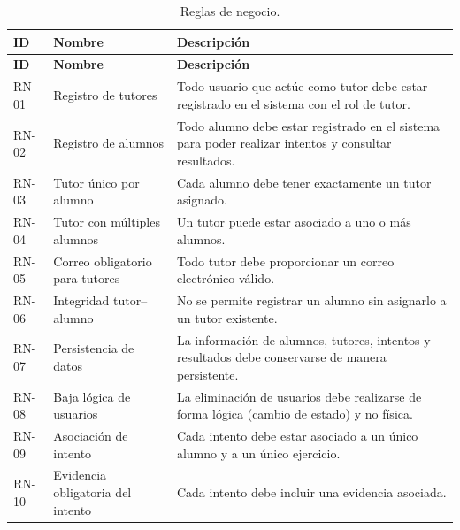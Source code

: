 \begin{longtable}{|>{\centering\arraybackslash}m{2cm}|m{3.6cm}|
  Y{\dimexpr\textwidth-5.6cm-6\arrayrulewidth\relax}|}
\caption{Reglas de negocio.}
\label{tab:rn} \\

\hline
\textbf{ID} & \textbf{Nombre} & \textbf{Descripción}  \\
\hline
\endfirsthead

\hline
\textbf{ID} & \textbf{Nombre} & \textbf{Descripción}  \\
\hline
\endhead

\hline
\endfoot
\endlastfoot

RN-01 & Registro de tutores &
Todo usuario que actúe como tutor debe estar registrado en el sistema con el rol de tutor. \\ \hline

RN-02 & Registro de alumnos &
Todo alumno debe estar registrado en el sistema para poder realizar intentos y consultar resultados. \\ \hline

RN-03 & Tutor único por alumno &
Cada alumno debe tener exactamente un tutor asignado. \\ \hline

RN-04 & Tutor con múltiples alumnos &
Un tutor puede estar asociado a uno o más alumnos. \\ \hline

RN-05 & Correo obligatorio para tutores &
Todo tutor debe proporcionar un correo electrónico válido. \\ \hline

RN-06 & Integridad tutor--alumno &
No se permite registrar un alumno sin asignarlo a un tutor existente. \\ \hline

RN-07 & Persistencia de datos &
La información de alumnos, tutores, intentos y resultados debe conservarse de manera persistente. \\ \hline

RN-08 & Baja lógica de usuarios &
La eliminación de usuarios debe realizarse de forma lógica (cambio de estado) y no física. \\ \hline

RN-09 & Asociación de intento &
Cada intento debe estar asociado a un único alumno y a un único ejercicio. \\ \hline

RN-10 & Evidencia obligatoria del intento &
Cada intento debe incluir una evidencia asociada. \\ \hline


\end{longtable}
